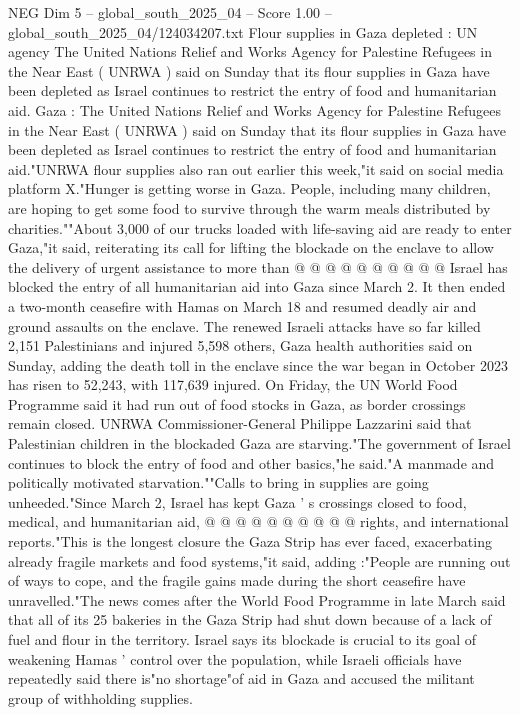 \begin{textsample}{NEG Dim 5 – global\_south\_2025\_04 – Score 1.00 – global\_south\_2025\_04/124034207.txt}  \label{ex:f5_neg_393}
Flour supplies in Gaza depleted : UN agency The United Nations Relief and Works Agency for Palestine Refugees in the Near East ( UNRWA ) said on Sunday that its flour supplies in Gaza have been depleted as Israel continues to restrict the entry of food and humanitarian aid.
Gaza : The United Nations Relief and Works Agency for Palestine Refugees in the Near East ( UNRWA ) said on Sunday that its flour supplies in Gaza have been depleted as Israel continues to restrict the entry of food and humanitarian aid."UNRWA flour supplies also ran out earlier this week,"it said on social media platform X."Hunger is getting worse in Gaza.
People, including many children, are hoping to get some food to survive through the warm meals distributed by charities.""About 3,000 of our trucks loaded with life-saving aid are ready to enter Gaza,"it said, reiterating its call for lifting the blockade on the enclave to allow the delivery of urgent assistance to more than @ @ @ @ @ @ @ @ @ @ Israel has blocked the entry of all humanitarian aid into Gaza since March 2.
It then ended a two-month ceasefire with Hamas on March 18 and resumed deadly air and ground assaults on the enclave.
The renewed Israeli attacks have so far killed 2,151 Palestinians and injured 5,598 others, Gaza health authorities said on Sunday, adding the death toll in the enclave since the war began in October 2023 has risen to 52,243, with 117,639 injured.
On Friday, the UN World Food Programme said it had run out of food stocks in Gaza, as border crossings remain closed.
UNRWA Commissioner-General Philippe Lazzarini said that Palestinian children in the blockaded Gaza are starving."The government of Israel continues to block the entry of food and other basics,"he said."A manmade and politically motivated starvation.""Calls to bring in supplies are going unheeded."Since March 2, Israel has kept Gaza ' s crossings closed to food, medical, and humanitarian aid, @ @ @ @ @ @ @ @ @ @ rights, and international reports."This is the longest closure the Gaza Strip has ever faced, exacerbating already fragile markets and food systems,"it said, adding :"People are running out of ways to cope, and the fragile gains made during the short ceasefire have unravelled."The news comes after the World Food Programme in late March said that all of its 25 bakeries in the Gaza Strip had shut down because of a lack of fuel and flour in the territory.
Israel says its blockade is crucial to its goal of weakening Hamas ' control over the population, while Israeli officials have repeatedly said there is"no shortage"of aid in Gaza and accused the militant group of withholding supplies.

\end{textsample}
